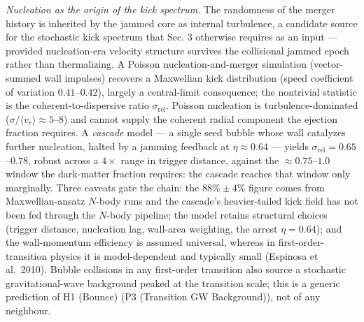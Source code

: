 \documentclass[
]{article}
\begin{document}
\emph{Nucleation as the origin of the kick spectrum.} The randomness of
the merger history is inherited by the jammed core as internal
turbulence, a candidate source for the stochastic kick spectrum that
Sec. 3 otherwise requires as an input --- provided nucleation-era
velocity structure survives the collisional jammed epoch rather than
thermalizing. A Poisson nucleation-and-merger simulation (vector-summed
wall impulses) recovers a Maxwellian kick distribution (speed
coefficient of variation \(0.41\)--\(0.42\)), largely a central-limit
consequence; the nontrivial statistic is the coherent-to-dispersive
ratio \(\sigma_{\text{rel}}\). Poisson nucleation is
turbulence-dominated (\(\sigma/\langle v_r\rangle \approx 5\)--\(8\))
and cannot supply the coherent radial component the ejection fraction
requires. A \emph{cascade} model --- a single seed bubble whose wall
catalyzes further nucleation, halted by a jamming feedback at
\(\eta \approx 0.64\) --- yields
\(\sigma_{\text{rel}} = 0.65\)--\(0.78\), robust across a \(4\times\)
range in trigger distance, against the \(\approx 0.75\)--\(1.0\) window
the dark-matter fraction requires: the cascade reaches that window only
marginally. Three caveats gate the chain: the \(88\% \pm 4\%\) figure
comes from Maxwellian-ansatz \(N\)-body runs and the cascade's
heavier-tailed kick field has not been fed through the \(N\)-body
pipeline; the model retains structural choices (trigger distance,
nucleation lag, wall-area weighting, the arrest \(\eta = 0.64\)); and
the wall-momentum efficiency is assumed universal, whereas in
first-order-transition physics it is model-dependent and typically small
(Espinosa et al.~2010). Bubble collisions in any first-order transition
also source a stochastic gravitational-wave background peaked at the
transition scale; this is a generic prediction of H1 (Bounce) (P3
(Transition GW Background)), not of any neighbour.
\end{document}
